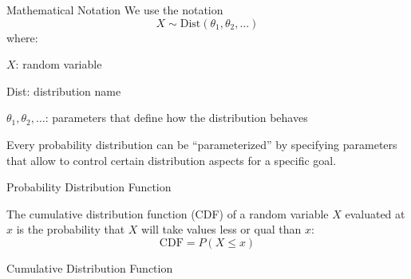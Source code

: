 \begin{frame}[noframenumbering]{Mathematical Notation}
	We use the notation
	$$X \sim \text{Dist}(\theta_1, \theta_2, \dots)$$
	where:
	\begin{vfilleditems}
		\item $X$: random variable
		\item Dist: distribution name
		\item $\theta_1, \theta_2, \dots$: parameters that define how the
		distribution behaves
	\end{vfilleditems}
	Every probability distribution can be ``parameterized'' by specifying
	parameters that allow to control certain distribution aspects for
	a specific goal.
\end{frame}

\begin{frame}[noframenumbering]{Probability Distribution Function}
	\centering
\end{frame}

\begin{frame}[noframenumbering]
	\begin{defn}
		The cumulative distribution function (CDF) of a random variable
		$X$ evaluated at $x$ is the probability that $X$ will take
		values less or qual than $x$:
		$$\text{CDF} = P(X \leq x)$$
	\end{defn}
\end{frame}

\begin{frame}[noframenumbering]{Cumulative Distribution Function}
	\centering
\end{frame}

